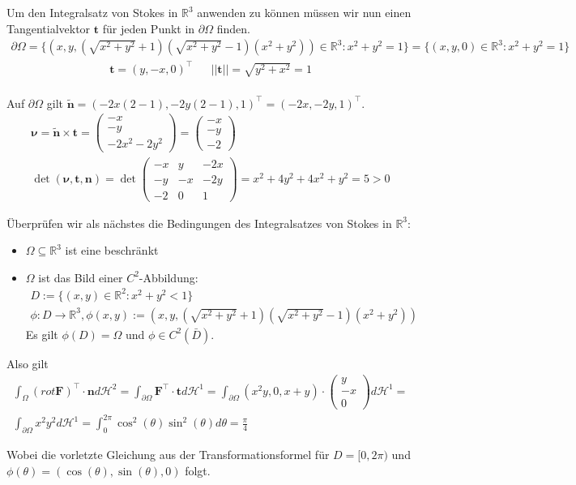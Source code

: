 \documentclass[]{article}
\begin{document}
Um den Integralsatz von Stokes in $\mathbb{R}^3$ anwenden zu können müssen wir nun einen Tangentialvektor $\bm{t}$ für jeden Punkt in $\partial\Omega$ finden.
\begin{align*}
	\partial\Omega = \{(x,y,(\sqrt{x^2+y^2}+1)(\sqrt{x^2+y^2}-1)(x^2+y^2)) \in \mathbb{R}^3: x^2+y^2=1\} = \{(x,y,0) \in \mathbb{R}^3: x^2+y^2=1\}
\end{align*}
\begin{align*}
	\bm{t} = (y, -x, 0)^\top && ||\bm{t}|| = \sqrt{y^2+x^2} = 1\\
\end{align*}

Auf $\partial\Omega$ gilt $\tilde{\bm{n}}=(-2x(2-1), -2y(2-1), 1)^\top = (-2x, -2y, 1)^\top$.
\begin{align*}
	\bm{\nu} = \tilde{\bm{n}} \times \bm{t} = \begin{pmatrix} -x\\ -y\\ -2x^2-2y^2 \end{pmatrix} = \begin{pmatrix} -x\\ -y\\ -2 \end{pmatrix}\\
	\det(\bm{\nu}, \bm{t}, \bm{n}) = \det\begin{pmatrix}
		-x & y & -2x\\
		-y & -x  & -2y\\
		-2 & 0  & 1
	\end{pmatrix} = x^2+4y^2+4x^2+y^2 = 5 > 0
\end{align*}

Überprüfen wir als nächstes die Bedingungen des Integralsatzes von Stokes in $\mathbb{R}^3$:

\begin{itemize}
	\item $\Omega \subseteq \mathbb{R}^3$ ist eine beschränkt
	\item $\Omega$ ist das Bild einer $C^2$-Abbildung:
	\begin{align*}
		D := \{(x,y)\in\mathbb{R}^2: x^2+y^2 < 1\}\\
		\phi: D \rightarrow \mathbb{R}^3, \phi(x, y) := (x, y, (\sqrt{x^2+y^2}+1)(\sqrt{x^2+y^2}-1)(x^2+y^2))
	\end{align*}
	Es gilt $\phi(D)=\Omega$ und $\phi \in C^2(\bar{D})$.
\end{itemize}

Also gilt
\begin{align*}
	\int_\Omega (rot\bm{F})^\top \cdot \bm{n} d\mathcal{H}^2 = \int_{\partial\Omega} \bm{F}^\top \cdot \bm{t} d\mathcal{H}^1 = \int_{\partial\Omega} (x^2y, 0, x+y) \cdot \begin{pmatrix} y\\ -x\\ 0 \end{pmatrix} d\mathcal{H}^1 =\\
	\int_{\partial\Omega} x^2y^2 d\mathcal{H}^1 = \int_{0}^{2\pi} \cos^2(\theta) \sin^2(\theta) d\theta = \frac{\pi}{4}
\end{align*}

Wobei die vorletzte Gleichung aus der Transformationsformel für $D=[0,2\pi)$ und $\phi(\theta)=(\cos(\theta), \sin(\theta), 0)$ folgt.
\end{document}
